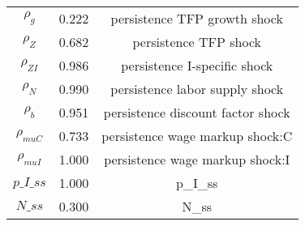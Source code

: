 \begin{center}
\begin{longtable}{ccc}
${\rho_g}$ 	 & 	 0.222 	 & 	 persistence TFP growth shock\\
${\rho_Z}$ 	 & 	 0.682 	 & 	 persistence TFP shock\\
${\rho_{ZI}}$ 	 & 	 0.986 	 & 	 persistence I-specific shock\\
${\rho_N}$ 	 & 	 0.990 	 & 	 persistence labor supply shock\\
${\rho_b}$ 	 & 	 0.951 	 & 	 persistence discount factor shock\\
${\rho_{muC}}$ 	 & 	 0.733 	 & 	 persistence wage markup shock:C\\
${\rho_{muI}}$ 	 & 	 1.000 	 & 	 persistence wage markup shock:I\\
$p\_I\_ss$ 	 & 	 1.000 	 & 	 p\_I\_ss\\
$N\_ss$ 	 & 	 0.300 	 & 	 N\_ss\\
\bottomrule%
\end{longtable}
\end{center}
